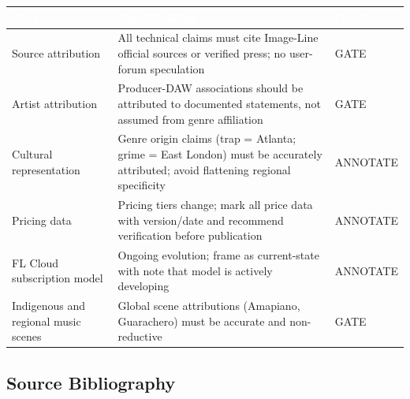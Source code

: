 \documentclass[11pt,letterpaper]{article}
\newcommand{\tableheader}[1]{\textbf{\sffamily\textcolor{white}{#1}}}
\begin{document}
\begin{center}
\begin{tabularx}{\textwidth}{L{3.5cm}XC{2.5cm}}
\toprule
{}
\tableheader{Area} & \tableheader{Consideration} & \tableheader{Level} \\
\midrule
Source attribution & All technical claims must cite Image-Line official sources or verified press; no user-forum speculation & GATE \\
Artist attribution & Producer-DAW associations should be attributed to documented statements, not assumed from genre affiliation & GATE \\
Cultural representation & Genre origin claims (trap = Atlanta; grime = East London) must be accurately attributed; avoid flattening regional specificity & ANNOTATE \\
Pricing data & Pricing tiers change; mark all price data with version/date and recommend verification before publication & ANNOTATE \\
FL Cloud subscription model & Ongoing evolution; frame as current-state with note that model is actively developing & ANNOTATE \\
Indigenous and regional music scenes & Global scene attributions (Amapiano, Guarachero) must be accurate and non-reductive & GATE \\
\bottomrule
\end{tabularx}
\end{center}

\subsection{Source Bibliography}
\end{document}
